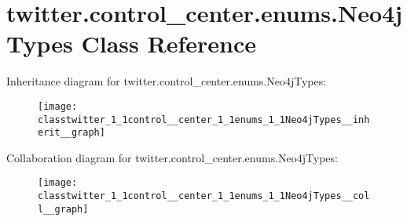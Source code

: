\hypertarget{classtwitter_1_1control__center_1_1enums_1_1Neo4jTypes}{}\section{twitter.\+control\+\_\+center.\+enums.\+Neo4j\+Types Class Reference}
\label{classtwitter_1_1control__center_1_1enums_1_1Neo4jTypes}


Inheritance diagram for twitter.\+control\+\_\+center.\+enums.\+Neo4j\+Types\+:
\nopagebreak
\begin{figure}[H]
\begin{center}
\leavevmode
\texttt{[image: classtwitter\_1\_1control\_\_center\_1\_1enums\_1\_1Neo4jTypes\_\_inherit\_\_graph]}
\end{center}
\end{figure}


Collaboration diagram for twitter.\+control\+\_\+center.\+enums.\+Neo4j\+Types\+:
\nopagebreak
\begin{figure}[H]
\begin{center}
\leavevmode
\texttt{[image: classtwitter\_1\_1control\_\_center\_1\_1enums\_1\_1Neo4jTypes\_\_coll\_\_graph]}
\end{center}
\end{figure}
